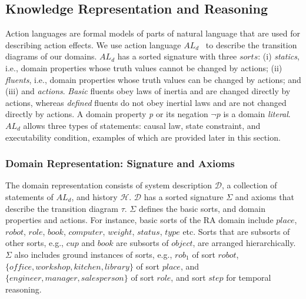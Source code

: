 \documentclass{article}
\begin{document}
\subsection{Knowledge Representation and Reasoning}
\label{sec:arch-asp}
Action languages are formal models of parts of natural language that
are used for describing action effects. We use action language
$AL_d$~\cite{gelfond:ANCL13} to describe the transition diagrams of
our domains. $AL_d$ has a sorted signature with three $sorts$: (i)
\emph{statics}, i.e., domain properties whose truth values cannot be
changed by actions; (ii) \emph{fluents}, i.e., domain properties whose
truth values can be changed by actions; and (iii) and \emph{actions}.
\emph{Basic} fluents obey laws of inertia and are changed directly by
actions, whereas \emph{defined} fluents do not obey inertial laws and
are not changed directly by actions. A domain property \emph{p} or its
negation $\lnot p$ is a domain \emph{literal}. $AL_d$ allows three
types of statements: causal law, state constraint, and executability
condition, examples of which are provided later in this section.


\subsubsection{Domain Representation: Signature and Axioms}
The domain representation consists of system description
$\mathcal{D}$, a collection of statements of $AL_d$, and history
$\mathcal{H}$. $\mathcal{D}$ has a sorted signature $\Sigma$ and
axioms that describe the transition diagram $\tau$. $\Sigma$ defines
the basic sorts, and domain properties and actions. For instance,
basic sorts of the RA domain include $place$, $robot$, $role$, $book$,
$computer$, $weight$, $status$, $type$ etc.  Sorts that are subsorts
of other sorts, e.g., $cup$ and $book$ are subsorts of $object$, are
arranged hierarchically.  $\Sigma$ also includes ground instances of
sorts, e.g., $rob_1$ of sort $robot$, $\{office, workshop, kitchen,
library\}$ of sort $place$, and $\{engineer, manager, salesperson\}$
of sort $role$, and sort $step$ for temporal reasoning.
\end{document}
